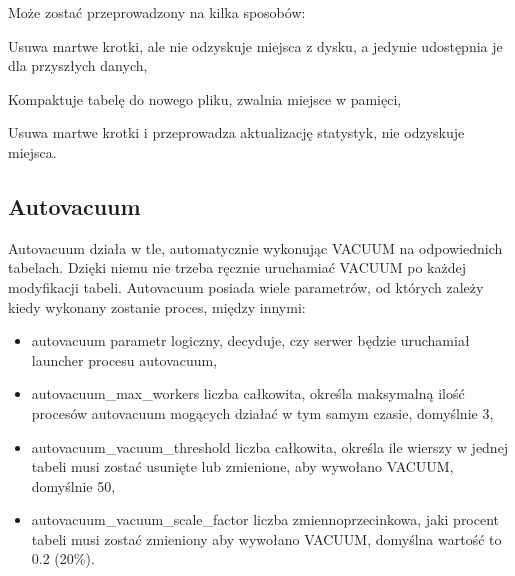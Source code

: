 \documentclass[a4paper,11pt,polish]{sphinxmanual}
\begin{document}
\sphinxAtStartPar
Może zostać przeprowadzony na kilka sposobów:

\begin{sphinxVerbatim}[commandchars=\\\{\}]
\end{sphinxVerbatim}

\sphinxAtStartPar
Usuwa martwe krotki, ale nie odzyskuje miejsca z dysku, a jedynie udostępnia je dla przyszłych danych,

\begin{sphinxVerbatim}[commandchars=\\\{\}]
\end{sphinxVerbatim}

\sphinxAtStartPar
Kompaktuje tabelę do nowego pliku, zwalnia miejsce w pamięci,

\begin{sphinxVerbatim}[commandchars=\\\{\}]
\end{sphinxVerbatim}

\sphinxAtStartPar
Usuwa martwe krotki i przeprowadza aktualizację statystyk, nie odzyskuje miejsca.


\subsection{Autovacuum}
\label{\detokenize{Kontrola_i_konserwacja/kontrola_i_konserwacja:autovacuum}}
\sphinxAtStartPar
Autovacuum działa w tle, automatycznie wykonując VACUUM na odpowiednich tabelach. Dzięki niemu nie trzeba ręcznie uruchamiać VACUUM po każdej modyfikacji tabeli. Autovacuum posiada wiele parametrów, od których zależy kiedy wykonany zostanie proces, między innymi:
\begin{itemize}
\item {} 
\sphinxAtStartPar
autovacuum \sphinxhyphen{} parametr logiczny, decyduje, czy serwer będzie uruchamiał launcher procesu autovacuum,

\item {} 
\sphinxAtStartPar
autovacuum\_max\_workers \sphinxhyphen{} liczba całkowita, określa maksymalną ilość procesów autovacuum mogących działać w tym samym czasie, domyślnie 3,

\item {} 
\sphinxAtStartPar
autovacuum\_vacuum\_threshold \sphinxhyphen{} liczba całkowita, określa ile wierszy w jednej tabeli musi zostać usunięte lub zmienione, aby wywołano VACUUM, domyślnie 50,

\item {} 
\sphinxAtStartPar
autovacuum\_vacuum\_scale\_factor \sphinxhyphen{} liczba zmiennoprzecinkowa, jaki procent tabeli musi zostać zmieniony aby wywołano VACUUM, domyślna wartość to 0.2 (20\%).

\end{itemize}
\end{document}

